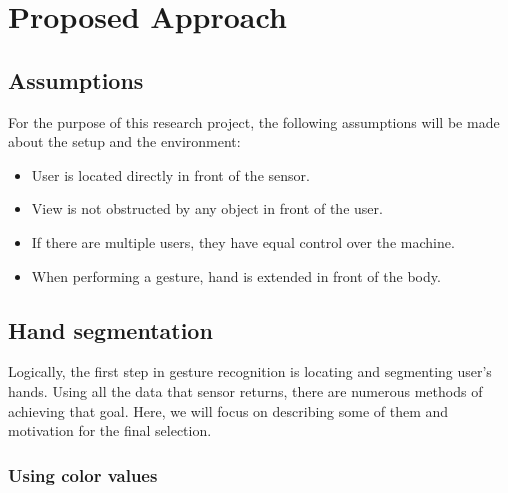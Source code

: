 \documentclass[a4paper,11pt,oneside]{article}
\begin{document}
  \section{Proposed Approach}
  
  \subsection{Assumptions}
  
  For the purpose of this research project, the following assumptions will be made about the setup and the environment:\\
  
  \begin{itemize}
  \item User is located directly in front of the sensor.
  \item View is not obstructed by any object in front of the user.
  \item If there are multiple users, they have equal control over the machine.
  \item When performing a gesture, hand is extended in front of the body.
  \end{itemize}
  
  \subsection{Hand segmentation}
  
  Logically, the first step in gesture recognition is locating and segmenting user's hands. Using all the data that sensor returns, there are numerous methods of achieving that goal. Here, we will focus on describing some of them and motivation for the final selection.
  
  \subsubsection{Using color values}
  
\end{document}
